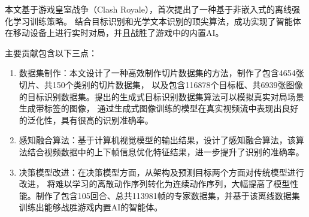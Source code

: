 

% 
% 
% 
% 
本文基于游戏皇室战争（Clash Royale），首次提出了一种基于非嵌入式的离线强化学习训练策略。
结合目标识别和光学文本识别的顶尖算法，成功实现了智能体在移动设备上进行实时对局，并且战胜了游戏中的内置AI。

主要贡献包含以下三点：
\begin{enumerate}
  \item 数据集制作：本文设计了一种高效制作切片数据集的方法，制作了包含4654张切片、共150个类别的切片数据集，
  以及包含116878个目标框、共6939张图像的目标识别数据集。提出的生成式目标识别数据集算法可以模拟真实对局场景生成带标签的图像，
  通过生成式图像训练的模型在真实视频流中表现出良好的泛化性，具有很高的识别准确率。
  \item 感知融合算法：基于计算机视觉模型的输出结果，设计了感知融合算法，该算法结合视频数据中的上下帧信息优化特征结果，进一步提升了识别的准确率。
  \item 决策模型改进：在决策模型方面，从架构及预测目标两个方面对传统模型进行改进，
  将难以学习的离散动作序列转化为连续动作序列，大幅提高了模型性能。制作了包含105回合、总共113981帧的专家数据集，并基于该离线数据集训练出能够战胜游戏内置AI的智能体。
\end{enumerate}

